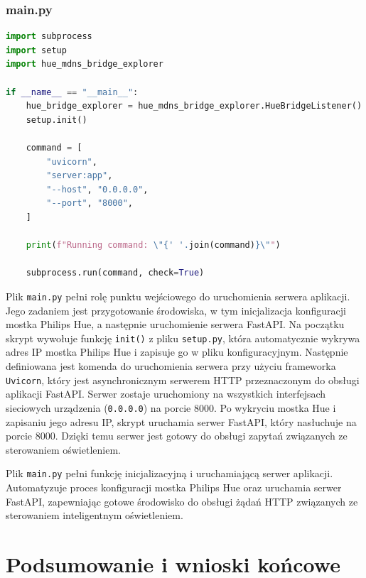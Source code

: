 \documentclass[12pt]{article}
\begin{document}
\subsubsection{ main.py}
\begin{lstlisting}[language=Python]
import subprocess
import setup
import hue_mdns_bridge_explorer

if __name__ == "__main__":
    hue_bridge_explorer = hue_mdns_bridge_explorer.HueBridgeListener()
    setup.init()

    command = [
        "uvicorn",
        "server:app",
        "--host", "0.0.0.0",
        "--port", "8000",
    ]

    print(f"Running command: \"{' '.join(command)}\"")

    subprocess.run(command, check=True)
\end{lstlisting}
Plik \texttt{main.py} pełni rolę punktu wejściowego do uruchomienia serwera aplikacji. Jego zadaniem jest przygotowanie środowiska, w tym inicjalizacja konfiguracji mostka Philips Hue,
a następnie uruchomienie serwera FastAPI. Na początku skrypt wywołuje funkcję \texttt{init()} z pliku \texttt{setup.py}, która automatycznie wykrywa adres IP mostka Philips Hue i zapisuje
go w pliku konfiguracyjnym. Następnie definiowana jest komenda do uruchomienia serwera przy użyciu frameworka \texttt{Uvicorn}, który jest asynchronicznym serwerem HTTP przeznaczonym do obsługi
aplikacji FastAPI. Serwer zostaje uruchomiony na wszystkich interfejsach sieciowych urządzenia (\texttt{0.0.0.0}) na porcie 8000. Po wykryciu mostka Hue i zapisaniu jego adresu IP, skrypt uruchamia
serwer FastAPI, który nasłuchuje na porcie 8000. Dzięki temu serwer jest gotowy do obsługi zapytań związanych ze sterowaniem oświetleniem.

Plik \texttt{main.py} pełni funkcję inicjalizacyjną i uruchamiającą serwer aplikacji. Automatyzuje proces konfiguracji mostka Philips Hue oraz uruchamia serwer FastAPI, zapewniając gotowe
środowisko do obsługi żądań HTTP związanych ze sterowaniem inteligentnym oświetleniem.














\clearpage

\section{Podsumowanie i wnioski końcowe}
\end{document}
